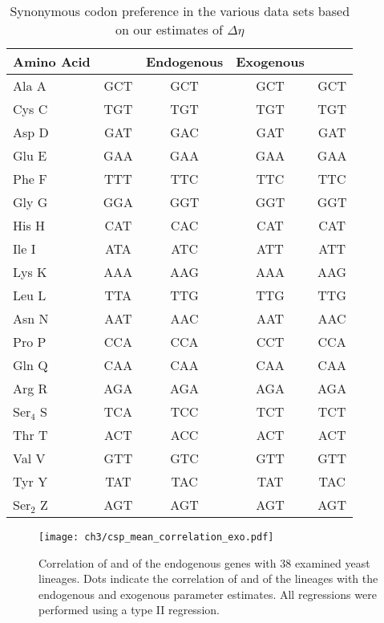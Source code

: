 \begin{table}
    \centering
\begin{tabular}{  l  c  c  c  c  }
\hline
	Amino Acid & \gossypii & Endogenous & Exogenous & \kluyveri \\ \hline \hline
	Ala A & GCT & GCT & GCT & GCT \\ \hline
	Cys C & TGT & TGT & TGT & TGT \\ \hline
	Asp D & GAT & GAC & GAT & GAT \\ \hline
	Glu E & GAA & GAA & GAA & GAA \\ \hline
	Phe F & TTT & TTC & TTC & TTC \\ \hline
	Gly G & GGA & GGT & GGT & GGT \\ \hline
	His H & CAT & CAC & CAT & CAT \\ \hline
	Ile I & ATA & ATC & ATT & ATT \\ \hline
	Lys K & AAA & AAG & AAA & AAG \\ \hline
	Leu L & TTA & TTG & TTG & TTG \\ \hline
	Asn N & AAT & AAC & AAT & AAC \\ \hline
	Pro P & CCA & CCA & CCT & CCA \\ \hline
	Gln Q & CAA & CAA & CAA & CAA \\ \hline
	Arg R & AGA & AGA & AGA & AGA \\ \hline
	Ser$_4$ S & TCA & TCC & TCT & TCT \\ \hline
	Thr T & ACT & ACC & ACT & ACT \\ \hline
	Val V & GTT & GTC & GTT & GTT \\ \hline
	Tyr Y & TAT & TAC & TAT & TAC \\ \hline
	Ser$_2$ Z & AGT & AGT & AGT & AGT \\ \hline
\end{tabular}
    \caption{Synonymous codon preference in the various data sets based on our estimates of $\Delta \eta$}
    \label{tab:codon_pref_deta}
\end{table}

\clearpage
\begin{figure}[H]
     \centering
	\texttt{[image: ch3/csp\_mean\_correlation\_exo.pdf]}
	\caption{Correlation of \DM and \DE of the endogenous genes with 38 examined yeast lineages. Dots indicate the correlation of \DM and \DE of the lineages with the endogenous and exogenous parameter estimates. All regressions were performed using a type II regression.}
	\label{fig:csp_endo_comp}
\end{figure}


